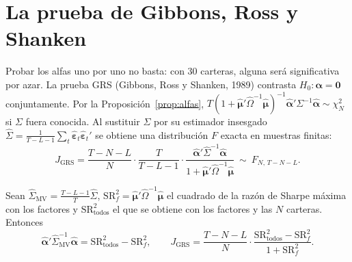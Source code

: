 \section{La prueba de Gibbons, Ross y Shanken}

Probar los alfas uno por uno no basta: con 30 carteras, alguna será significativa por azar. La prueba GRS (Gibbons,
Ross y Shanken, 1989) contrasta $H_0:\boldsymbol\alpha=\mathbf 0$ conjuntamente. Por la
Proposición~\ref{prop:alfas}, $T(1+\hat{\boldsymbol\mu}'\hat\Omega^{-1}\hat{\boldsymbol\mu})^{-1}\hat{\boldsymbol\alpha}'\Sigma^{-1}\hat{\boldsymbol\alpha}\sim\chi^2_N$ si
$\Sigma$ fuera conocida. Al sustituir $\Sigma$ por su estimador insesgado
$\hat\Sigma=\frac{1}{T-L-1}\sum_t\hat{\boldsymbol\varepsilon}_t\hat{\boldsymbol\varepsilon}_t'$ se obtiene una distribución $F$
exacta en muestras finitas:
\[
  J_{\text{GRS}}=\frac{T-N-L}{N}\cdot\frac{T}{T-L-1}\cdot
  \frac{\hat{\boldsymbol\alpha}'\hat\Sigma^{-1}\hat{\boldsymbol\alpha}}{1+\hat{\boldsymbol\mu}'\hat\Omega^{-1}\hat{\boldsymbol\mu}}
  \ \sim\ F_{N,\,T-N-L}.
\]

\begin{proposicion}\label{prop:grssharpe}
Sean $\hat\Sigma_{\text{MV}}=\frac{T-L-1}{T}\hat\Sigma$, $\mathrm{SR}^2_f=\hat{\boldsymbol\mu}'\hat\Omega^{-1}\hat{\boldsymbol\mu}$ el
cuadrado de la razón de Sharpe máxima con los factores y $\mathrm{SR}^2_{\text{todos}}$ el que se obtiene con los
factores y las $N$ carteras. Entonces
\[
  \hat{\boldsymbol\alpha}'\hat\Sigma_{\text{MV}}^{-1}\hat{\boldsymbol\alpha}=\mathrm{SR}^2_{\text{todos}}-\mathrm{SR}^2_f,
  \qquad
  J_{\text{GRS}}=\frac{T-N-L}{N}\cdot\frac{\mathrm{SR}^2_{\text{todos}}-\mathrm{SR}^2_f}{1+\mathrm{SR}^2_f}.
\]
\end{proposicion}

